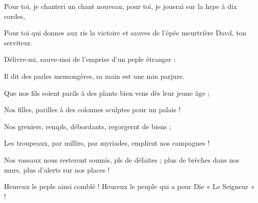 \item Pour toi, je chanteri un chant nouveau,\psstar{} pour toi, je jouerai sur la hrpe à dix cordes,
\item Pour toi qui donnes aux ris la victoire\psstar{} et sauves de l’épée meurtrière Davd, ton serviteur.
\item Délivre-mi, sauve-moi\psstar{} de l’emprise d’un peple étranger : 
\item Il dit des parles mensongères,\psstar{} sa main est une min parjure.
\item Que nos fils soient parils à des plants\psstar{} bien vens dès leur jeune âge ;
\item Nos filles, parilles à des colonnes\psstar{} sculptes pour un palais !
\item Nos greniers, rempls, débordants,\psstar{} regorgernt de biens ; 
\item Les troupeaux, par millirs, par myriades,\psstar{} emplirnt nos campagnes !
\item Nos vassaux nous resteront soumis, pls de défaites ;\psstar{} plus de brèches dans nos murs, plus d’alerts sur nos places !
\item Heureux le peple ainsi comblé !\psstar{} Heureux le peuple qui a pour Die « Le Seigneur » !